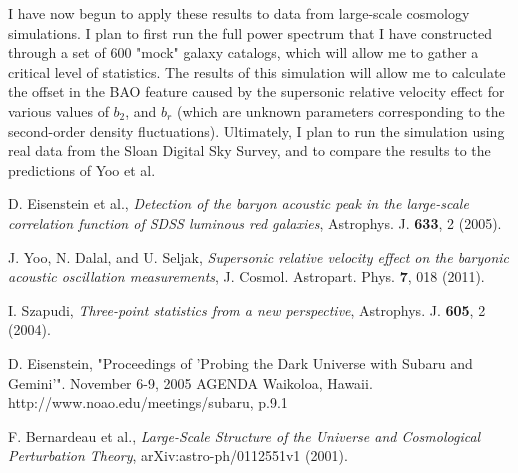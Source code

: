 \documentclass[12pt]{article}
\begin{document}
I have now begun to apply these results to data from large-scale cosmology simulations. I plan to first run the full power spectrum that I have constructed through a set of 600 "mock" galaxy catalogs, which will allow me to gather a critical level of statistics. The results of this simulation will allow me to calculate the offset in the BAO feature caused by the supersonic relative velocity effect for various values of $b_{2}$, and $b_{r}$ (which are unknown parameters corresponding to the second-order density fluctuations). Ultimately, I plan to run the simulation using real data from the Sloan Digital Sky Survey, and to compare the results to the predictions of Yoo et al.

\begin{thebibliography}{1}

D. Eisenstein et al., \emph{Detection of the baryon acoustic peak in the large-scale correlation function of SDSS luminous red galaxies}, Astrophys. J. \textbf{633}, 2 (2005).

J. Yoo, N. Dalal, and U. Seljak, \emph{Supersonic relative velocity effect on the baryonic acoustic oscillation measurements}, J. Cosmol. Astropart. Phys. \textbf{7}, 018 (2011). 

I. Szapudi, \emph{Three-point statistics from a new perspective}, Astrophys. J. \textbf{605}, 2 (2004).

D. Eisenstein, "Proceedings of 'Probing the Dark Universe with Subaru and Gemini'". November 6-9, 2005 AGENDA Waikoloa, Hawaii. http://www.noao.edu/meetings/subaru, p.9.1

F. Bernardeau et al., \emph{Large-Scale Structure of the Universe and Cosmological Perturbation Theory}, arXiv:astro-ph/0112551v1 (2001).

\end{thebibliography}
\end{document}
